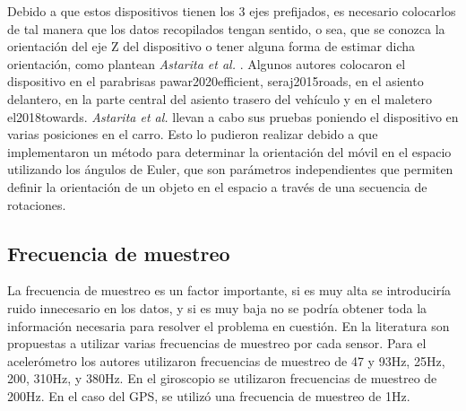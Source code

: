 		Debido a que estos dispositivos tienen los 3 ejes prefijados, es necesario colocarlos de tal manera que los datos recopilados tengan sentido, o sea,
		que se conozca la orientación del eje Z del dispositivo o tener alguna forma de estimar dicha orientación, como plantean \emph{Astarita et al.}
		. Algunos autores colocaron el dispositivo en el parabrisas\brackcite
		{pawar2020efficient, seraj2015roads}, en el asiento delantero, en la parte central del asiento trasero del vehículo y en el maletero\brackcite
		{el2018towards}. \emph{Astarita et al.} llevan a cabo sus pruebas poniendo el dispositivo en varias posiciones en
		el carro. Esto lo pudieron realizar debido a que implementaron un método para determinar la orientación del móvil en el espacio utilizando los
		ángulos de Euler, que son parámetros independientes que permiten definir la orientación de un objeto en el espacio a través de una secuencia de
		rotaciones.
		
	\subsection{Frecuencia de muestreo}
		La frecuencia de muestreo es un factor importante, si es muy alta se introduciría ruido innecesario en los datos, y si es muy baja no se podría
		obtener toda la información necesaria para resolver el problema en cuestión. En la literatura son propuestas a utilizar varias 
		frecuencias  de muestreo por cada sensor. Para el acelerómetro los autores utilizaron frecuencias de muestreo de 47 y 93Hz, 
		25Hz, 200, 310Hz, y 380Hz. En 
		el giroscopio se utilizaron frecuencias de muestreo de 200Hz. En el caso del GPS, se utilizó una frecuencia de muestreo 
		de 1Hz. 
		

